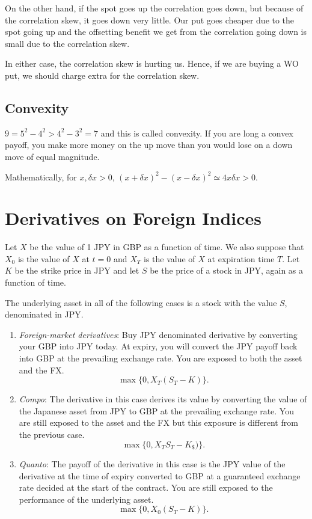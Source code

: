 \documentclass{amsart}
\theoremstyle{plain}
\numberwithin{equation}{section}
\begin{document}
On the other hand, if the spot goes up the correlation 
goes down, but because of the correlation skew,
it goes down very little. Our put goes cheaper due to 
the spot going up and the offsetting 
benefit we get from the correlation going down
is small due to the correlation skew.

In either case, the correlation skew is hurting us.
Hence, if we are buying a WO put, we should
charge extra for the correlation skew.
\subsection{Convexity}
$9 = 5^2 - 4^2 > 4^2 - 3^2 = 7$ and this is called convexity.
If you are long a convex payoff, you make more money 
on the up move than you would lose on a down move of equal magnitude.

Mathematically, for $x, \delta x > 0$,
$(x+\delta x)^2 - (x - \delta x )^2 \simeq 4x\delta x > 0$.

\section*{Derivatives on Foreign Indices}
Let $X$ be the value of 1 JPY in GBP as
a function of time. We also suppose that 
$X_0$ is the value of $X$ at $t=0$ and 
$X_T$ is the value of $X$ at expiration time $T$.
Let $K$ be the strike price in JPY and 
let $S$ be the price of a stock in JPY, again
as a function of time. 

The underlying asset in all of the following cases
is a stock with the value $S$, denominated in JPY. 

\begin{enumerate}
\item \emph{Foreign-market derivatives}:
Buy JPY denominated derivative by converting 
your GBP into JPY today. At expiry, 
you will convert the JPY payoff back
into GBP at the prevailing exchange rate.
You are exposed to both the asset and 
the FX.
\begin{equation}
\max\{0, X_T(S_T - K)\}.
\end{equation}
\item \emph{Compo}:
The derivative in this case
derives its value by converting the value 
of the Japanese asset from JPY to 
GBP at the prevailing exchange 
rate. You are still exposed to the 
asset and the FX but this exposure 
is different from the previous case.
\begin{equation}
\max\{0, X_T S_T - K_{\$})\}.
\end{equation}


\item \emph{Quanto}: The payoff of the 
derivative in this case is the
JPY value of the derivative at the 
time of expiry
converted to GBP at a guaranteed
exchange rate decided at the start 
of the contract. You are still exposed
to the performance of the underlying asset.
\begin{equation}
\max\{0, X_0(S_T - K)\}.
\end{equation}

\end{enumerate}
\end{document}

